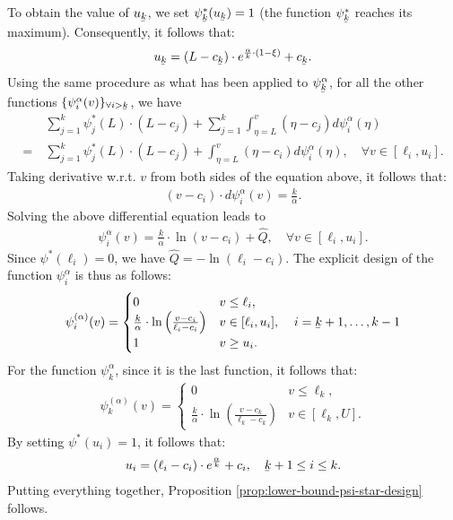 To obtain the value of $u_{\ubar{k}}$, we set $\psi^{*}_{\ubar{k}}(u_{\ubar{k}}) =1$ (the function $\psi^{*}_{\ubar{k}}$ reaches its maximum). Consequently, it follows that:
\begin{align*}
u_{\ubar{k}} = (L-c_{\ubar{k}}) \cdot e^{\frac{\alpha}{k}\cdot(1-\xi)} + c_{\ubar{k}}.
\end{align*}
Using the same procedure as what has been applied to $\psi^{\alpha}_{\ubar{k}}$, for all the other functions $\{\psi^{\alpha}_{i}(v)\}_{\forall i > \ubar{k}}$, we have
\begin{align*}
    &\sum_{j=1}^{k} \psi^{*}_{j}(L) \cdot (L - c_{j}) + \sum_{j=1}^{k} \int_{\eta =L}^{v} (\eta - c_{j} )d\psi^{\alpha}_{i}(\eta) \\
    =\ & \sum_{j=1}^{k}  \psi^{*}_{j}(L) \cdot (L - c_{j}) + \int_{\eta =L}^{v} (\eta - c_{i} )d\psi^{\alpha}_{i}(\eta) ,  \quad \forall v \in [\ell_{i},u_{i}].
\end{align*}
Taking derivative w.r.t. $ v $ from both sides of the equation above, it follows that:
\begin{align*}
    (v - c_{i}) \cdot d\psi^{\alpha}_{i}(v) = \frac{k}{\alpha}.
    \end{align*}
Solving the above differential equation leads to
\begin{align*}
\psi^{\alpha}_{i}(v) = \frac{k}{\alpha} \cdot \ln(v-c_{i}) + \hat{Q}, \quad \forall v \in [\ell_{i},u_{i}].
\end{align*}
Since $\psi^{*}(\ell_{i}) = 0$, we have $ \hat{Q} = - \ln(\ell_{i}-c_{i})$. The explicit design of the function $\psi^{\alpha}_{i}$ is thus as follows:
\begin{align*}
\psi^{(\alpha)}_{i}(v) = \begin{cases} 0 & v \leq \ell_{i}, \\
        \frac{k}{\alpha} \cdot \ln\left(\frac{v - c_{i}}{\ell_{i} - c_{i}}\right) &  v \in [\ell_{i},u_{i}], \\
        1 & v \ge u_{i}.
        \end{cases} \quad  i = \ubar{k}+1,\dots, k-1
\end{align*}
For the function $\psi_{k}^{\alpha}$, since it is the last function, it follows that:
\begin{align*}
    \psi^{(\alpha)}_{k}(v) = \begin{cases} 0 & v \leq \ell_{k}, \\
        \frac{k}{\alpha} \cdot \ln\left(\frac{v - c_{k}}{\ell_{k} - c_{k}}\right) &  v \in [\ell_{k},U].
        \end{cases}
\end{align*}
By setting $\psi^{*}(u_{i}) = 1$, it follows that:
\begin{align*}
u_{i} = (\ell_{i}-c_{i}) \cdot e^{\frac{\alpha}{k}} + c_{i}, \quad   \ubar{k}+1 \leq i \leq k.
\end{align*}
Putting everything together, Proposition \ref{prop:lower-bound-psi-star-design} follows.


